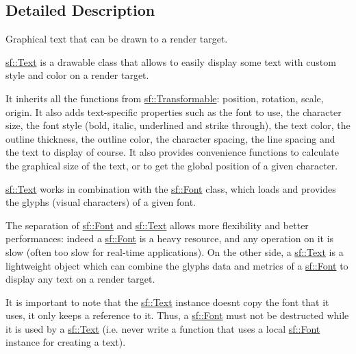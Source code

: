 \subsection{Detailed Description}
Graphical text that can be drawn to a render target. 

\begin{DoxyVerb}\end{DoxyVerb}


\mbox{\hyperlink{classsf_1_1_text}{sf\+::\+Text}} is a drawable class that allows to easily display some text with custom style and color on a render target.

It inherits all the functions from \mbox{\hyperlink{classsf_1_1_transformable}{sf\+::\+Transformable}}\+: position, rotation, scale, origin. It also adds text-\/specific properties such as the font to use, the character size, the font style (bold, italic, underlined and strike through), the text color, the outline thickness, the outline color, the character spacing, the line spacing and the text to display of course. It also provides convenience functions to calculate the graphical size of the text, or to get the global position of a given character.

\mbox{\hyperlink{classsf_1_1_text}{sf\+::\+Text}} works in combination with the \mbox{\hyperlink{classsf_1_1_font}{sf\+::\+Font}} class, which loads and provides the glyphs (visual characters) of a given font.

The separation of \mbox{\hyperlink{classsf_1_1_font}{sf\+::\+Font}} and \mbox{\hyperlink{classsf_1_1_text}{sf\+::\+Text}} allows more flexibility and better performances\+: indeed a \mbox{\hyperlink{classsf_1_1_font}{sf\+::\+Font}} is a heavy resource, and any operation on it is slow (often too slow for real-\/time applications). On the other side, a \mbox{\hyperlink{classsf_1_1_text}{sf\+::\+Text}} is a lightweight object which can combine the glyphs data and metrics of a \mbox{\hyperlink{classsf_1_1_font}{sf\+::\+Font}} to display any text on a render target.

It is important to note that the \mbox{\hyperlink{classsf_1_1_text}{sf\+::\+Text}} instance doesn\textquotesingle{}t copy the font that it uses, it only keeps a reference to it. Thus, a \mbox{\hyperlink{classsf_1_1_font}{sf\+::\+Font}} must not be destructed while it is used by a \mbox{\hyperlink{classsf_1_1_text}{sf\+::\+Text}} (i.\+e. never write a function that uses a local \mbox{\hyperlink{classsf_1_1_font}{sf\+::\+Font}} instance for creating a text).

